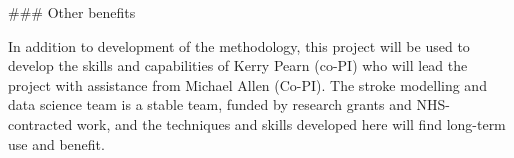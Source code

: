 \begin{markdown}
### Other benefits

In addition to development of the methodology, this project will be used to develop the skills and capabilities of Kerry Pearn (co-PI) who will lead the project with assistance from Michael Allen (Co-PI). The stroke modelling and data science team is a stable team, funded by research grants and NHS-contracted work, and the techniques and skills developed here will find long-term use and benefit.

\end{markdown}